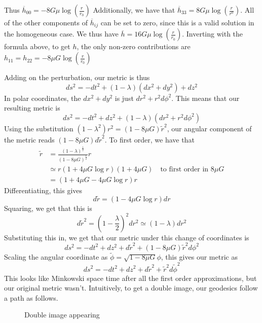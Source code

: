 \documentclass[11pt, a4paper]{article}   	%
\theoremstyle{slplain}
\begin{document}
Thus $ \overline{h } _{ 00 }  = - 8 G \mu \log \left( \frac{ r }{ r _ 0 }  \right) $ 
Additionally, we have that $ \overline{ h } _{ 33 }  = 8 G \mu \log \left( \frac{ r }{ r^0 } \right) $. All of the other components of $ \overline{ h} _{ ij } $  
can be set to zero, since this is a valid solution 
in the homogeneous case. We thus have $ \overline{ h }  = 16 G \mu 
\log \left( \frac{r}{ r_0 }  \right) $. Inverting with the formula above, 
to get $ h $, the only non-zero contributions are
$ h_{ 11 }  = h _{ 22 }  =  -  8 \mu G \log \left( \frac{r}{ r_0 } \right) $

Adding on the perturbation, our metric is thus 
\[
	ds ^ 2  = - dt ^ 2 + \left( 1 - \lambda  \right) \left( dx ^ 2 + dy ^ 2  \right)  + dz ^ 2 
\] In polar coordinates, the $ dx ^ 2 + dy ^ 2 $ is just $ dr ^ 2  + r ^ 2 d \phi ^ 2 $. 
This means that our resulting metric is 
\[
	ds ^ 2 =  - dt ^ 2 + dz ^  2 + \left( 1 - \lambda   \right)  \left( dr ^ 2 + r ^ 2 d \phi ^ 2  \right) 
\] Using the substitution $ \left( 1 - \lambda ^ 2   \right) r ^ 2  = \left( 1 - 8 \mu G  \right)  \tilde{r } ^ 2   $, our angular component of the 
metric reads $ \left( 1 - 8 \mu G  \right)  d \tilde{ r } ^ 2    $. 
To first order, we have that 
\begin{align*}
	\tilde{ r } &  = \frac{\left( 1 - \lambda  \right)  ^{ \frac{1}{2 } } }{ \left( 1 - 8 \mu G  \right)  ^{ \frac{1}{2 } }  } r  \\
		    &\simeq   r \left( 1 + 4 \mu G \log r   \right) \left(  1 + 4 \mu G   \right)    \quad \text{to first order in } 8 \mu G  \\ 
		    &=  \left( 1 + 4 \mu G  - 4 \mu G \log r  \right)  r  
\end{align*}  
Differentiating, this 
gives 
\[
	d \tilde{ r }  = \left( 1 - 4 \mu G \log r   \right)   dr 
\]  Squaring, we get that this is 
\[
	d \tilde{ r } ^ 2  = \left( 1 - \frac{\lambda}{2 }  \right)  ^ 2 dr ^ 2 
	\simeq \left(  1 - \lambda  \right)  dr ^ 2  
\] Substituting this in, we get that our metric under this change of coordinates 
is 
\[
	ds ^ 2  = - dt ^  2 + dz ^ 2 + d \tilde{ r } ^ 2 + \left( 1 - 8 \mu G  \right) \tilde{ r } ^ 2 d \phi ^ 2    
\] Scaling the angular coordinate as $ \tilde{ \phi }  = \sqrt{ 1 - 8 \mu G   }  \phi  $, 
this gives our metric as 
\[
 ds ^ 2 =  - dt ^2 + dz ^ 2 + d \tilde{ r } ^ 2 + \tilde{ r } ^2 d \tilde{ \phi } ^ 2    
\] This looks like Minkowski space time after all the first order approximations, 
but our original metric wasn't.
Intuitively, to get 
a double image, our geodesics follow a path as follows.
\hspace*{10cm}
\begin{figure}[htpb]
	\centering

\caption{Double image appearing}%
\label{fig:x2q2}
\end{figure}
\end{document}
